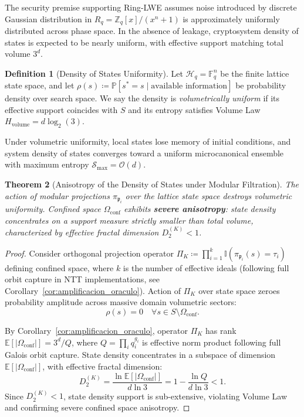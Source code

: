 \documentclass[11pt,a4paper]{article}
\theoremstyle{plain}
\newtheorem{teorema}{Theorem}[section]
\theoremstyle{definition}
\newtheorem{definicion}[teorema]{Definition}
\numberwithin{equation}{section}
\newcommand{\ZZ}{\mathbb{Z}}
\newcommand{\FF}{\mathbb{F}}
\newcommand{\cO}{\mathcal{O}}
\newcommand{\cS}{\mathcal{S}}
\newcommand{\cH}{\mathcal{H}}
\newcommand{\fkp}{\mathfrak{p}}
\newcommand{\E}{\mathbb{E}}
\newcommand{\Prob}{\mathbb{P}}
\begin{document}
The security premise supporting Ring-LWE assumes noise introduced by discrete Gaussian distribution in $R_q = \ZZ_q[x]/(x^n+1)$ is approximately uniformly distributed across phase space. In the absence of leakage, cryptosystem density of states is expected to be nearly uniform, with effective support matching total volume $3^d$.

\begin{definicion}[Density of States Uniformity]
\label{def:density_uniform}
Let $\cH_q = \FF_q^n$ be the finite lattice state space, and let $\rho(s) \coloneqq \Prob[s^*= s \mid \text{available information}]$ be probability density over search space. We say the density is \emph{volumetrically uniform} if its effective support coincides with $S$ and its entropy satisfies Volume Law $H_{\text{volume}} = d \log_2(3)$.
\end{definicion}

Under volumetric uniformity, local states lose memory of initial conditions, and system density of states converges toward a uniform microcanonical ensemble with maximum entropy $\cS_{\max} = \cO(d)$.

\begin{teorema}[Anisotropy of the Density of States under Modular Filtration]
\label{teo:anisotropia_espectral}
The action of modular projections $\pi_{\fkp_i}$ over the lattice state space destroys volumetric uniformity. Confined space $\Omega_{\text{conf}}$ exhibits \textbf{severe anisotropy}: state density concentrates on a support measure strictly smaller than total volume, characterized by effective fractal dimension $D_2^{(K)} < 1$.
\end{teorema}

\begin{proof}
Consider orthogonal projection operator $\Pi_K \coloneqq \prod_{i=1}^k \mathbb{I}(\pi_{\fkp_i}(s) = \tau_i)$ defining confined space, where $k$ is the number of effective ideals (following full orbit capture in NTT implementations, see Corollary~\ref{cor:amplificacion_oraculo}). Action of $\Pi_K$ over state space zeroes probability amplitude across massive domain volumetric sectors:
\begin{equation}
\rho(s) = 0 \quad \forall s \in S \setminus \Omega_{\text{conf}}.
\end{equation}

By Corollary~\ref{cor:amplificacion_oraculo}, operator $\Pi_K$ has rank $\E[|\Omega_{\text{conf}}|] = 3^d / Q$, where $Q = \prod_i q_i^{g_i}$ is effective norm product following full Galois orbit capture. State density concentrates in a subspace of dimension $\E[|\Omega_{\text{conf}}|]$, with effective fractal dimension:
\begin{equation}
D_2^{(K)} = \frac{\ln \E[|\Omega_{\text{conf}}|]}{d \ln 3} = 1 - \frac{\ln Q}{d \ln 3} < 1.
\end{equation}
Since $D_2^{(K)} < 1$, state density support is sub-extensive, violating Volume Law and confirming severe confined space anisotropy.
\end{proof}
\end{document}
